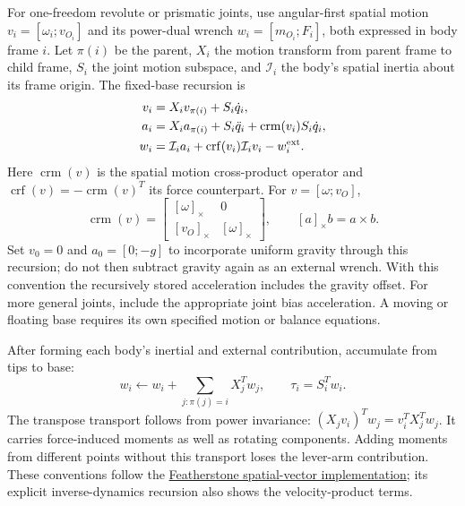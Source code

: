 For one-freedom revolute or prismatic joints, use angular-first spatial motion
$v_i=[\omega_i;v_{O_i}]$ and its power-dual wrench
$w_i=[m_{O_i};F_i]$, both expressed in body frame $i$. Let $\pi(i)$ be the
parent, $X_i$ the motion transform from parent frame to child frame, $S_i$ the
joint motion subspace, and $\mathcal I_i$ the body's spatial inertia about its
frame origin. The fixed-base recursion is
\begin{equation}
 \begin{aligned}
 v_i&=X_i v_{\pi(i)}+S_i\dot q_i,\\
 a_i&=X_i a_{\pi(i)}+S_i\ddot q_i
       +\operatorname{crm}(v_i)S_i\dot q_i,\\
 w_i&=\mathcal I_i a_i+
       \operatorname{crf}(v_i)\mathcal I_i v_i-w_i^{\rm ext}.
 \end{aligned}
 \label{eq:rnea_forward_complete}
\end{equation}
Here $\operatorname{crm}(v)$ is the spatial motion cross-product operator and
$\operatorname{crf}(v)=-\operatorname{crm}(v)^T$ its force counterpart.
For $v=[\omega;v_O]$,
\begin{equation}
 \operatorname{crm}(v)=
 \begin{bmatrix}[\omega]_\times&0\\{}[v_O]_\times&[\omega]_\times\end{bmatrix},
 \qquad [a]_\times b=a\times b.
 \label{eq:spatial_cross_operators}
\end{equation}
Set $v_0=0$ and $a_0=[0;-g]$ to incorporate uniform gravity through this
recursion; do not then subtract gravity again as an external wrench. With this
convention the recursively stored acceleration includes the gravity offset.
For more general joints, include the appropriate joint bias acceleration.
A moving or floating base requires its own specified motion or balance equations.

After forming each body's inertial and external contribution, accumulate from
tips to base:
\begin{equation}
 w_i\leftarrow w_i+\sum_{j:\pi(j)=i}X_j^T w_j,
 \qquad \tau_i=S_i^T w_i.
 \label{eq:rnea_backward_complete}
\end{equation}
The transpose transport follows from power invariance:
$(X_jv_i)^Tw_j=v_i^TX_j^Tw_j$. It carries force-induced moments as well as
rotating components. Adding moments from different points without this transport
loses the lever-arm contribution. These conventions follow the
\href{https://royfeatherstone.org/spatial/v2/}{Featherstone spatial-vector implementation};
its explicit inverse-dynamics recursion also shows the velocity-product terms.


